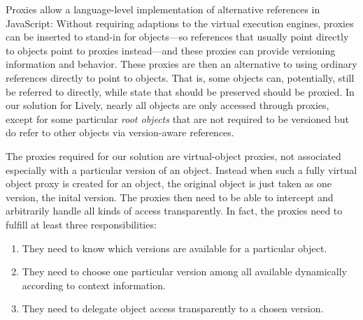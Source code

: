 Proxies allow a language-level implementation of alternative references in JavaScript:
Without requiring adaptions to the virtual execution engines, proxies can be inserted to stand-in for objects---so references that usually point directly to objects point to proxies instead---and these proxies can provide versioning information and behavior.
These proxies are then an alternative to using ordinary references directly to point to objects.
That is, some objects can, potentially, still be referred to directly, while state that should be preserved should be proxied.
In our solution for Lively, nearly all objects are only accessed through proxies, except for some particular \emph{root objects} that are not required to be versioned but do refer to other objects via version-aware references.

The proxies required for our solution are virtual-object proxies, not associated especially with a particular version of an object.
Instead when such a fully virtual object proxy is created for an object, the original object is just taken as one version, the inital version.
The proxies then need to be able to intercept and arbitrarily handle all kinds of access transparently.
In fact, the proxies need to fulfill at least three responsibilities:
\begin{enumerate}
    \item They need to know which versions are available for a particular object.
    \item They need to choose one particular version among all available dynamically according to context information.
    \item They need to delegate object access transparently to a chosen version.
\end{enumerate}

